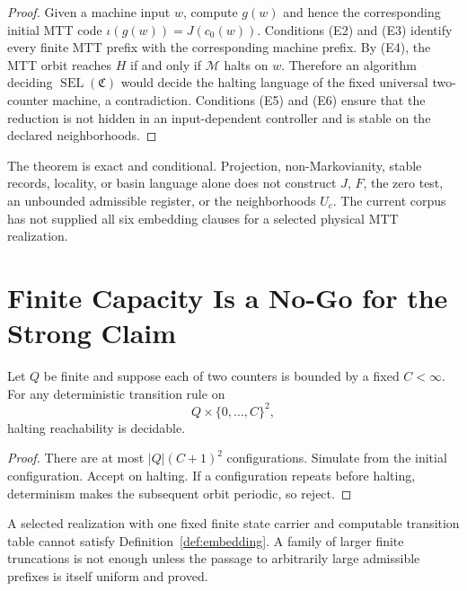 \documentclass[11pt]{article}
\begin{document}
\begin{proof}
Given a machine input $w$, compute $g(w)$ and hence the corresponding initial
MTT code $\iota(g(w))=J(c_0(w))$.  Conditions (E2) and (E3) identify every
finite MTT prefix with
the corresponding machine prefix.  By (E4), the MTT orbit reaches $H$ if and
only if $\mathcal M$ halts on $w$.  Therefore an algorithm deciding
$\operatorname{SEL}(\mathfrak C)$ would decide the halting language of the
fixed universal two-counter machine, a contradiction.  Conditions (E5) and
(E6) ensure that the reduction is not hidden in an input-dependent controller
and is stable on the declared neighborhoods.
\end{proof}

\begin{remark}
The theorem is exact and conditional.  Projection, non-Markovianity, stable
records, locality, or basin language alone does not construct $J$, $F$, the
zero test, an unbounded admissible register, or the neighborhoods $U_c$.
The current corpus has not supplied all six embedding clauses for a selected
physical MTT realization.
\end{remark}

\section{Finite Capacity Is a No-Go for the Strong Claim}

\begin{theorem}\label{thm:finite}
Let $Q$ be finite and suppose each of two counters is bounded by a fixed
$C<\infty$.  For any deterministic transition rule on
\[
Q\times\{0,\ldots,C\}^2,
\]
halting reachability is decidable.
\end{theorem}

\begin{proof}
There are at most $|Q|(C+1)^2$ configurations.  Simulate from the initial
configuration.  Accept on halting.  If a configuration repeats before
halting, determinism makes the subsequent orbit periodic, so reject.
\end{proof}

\begin{corollary}
A selected realization with one fixed finite state carrier and computable
transition table cannot satisfy Definition~\ref{def:embedding}.  A family of
larger finite truncations is not enough unless the passage to arbitrarily
large admissible prefixes is itself uniform and proved.
\end{corollary}
\end{document}
